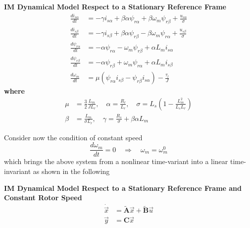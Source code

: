 \documentclass[11pt,a4paper]{scrartcl}
\numberwithin{equation}{section}
\theoremstyle{it}
\theoremstyle{definition}
\begin{document}
\begin{onehalfspace}
\begin{mybox}
	\textbf{IM Dynamical Model Respect to a Stationary Reference Frame}
	\begin{equation}\label{im_eq_33}
		\begin{aligned}
			\frac{di_{s\alpha}}{dt} &= -\gamma i_{s\alpha}  + 
			\beta\alpha\psi_{r\alpha}+\beta\omega_m\psi_{r\beta} + 
			\frac{u_{s\alpha}}{\sigma}\\[6pt]
			\frac{di_{s\beta}}{dt} &= -\gamma i_{s\beta}  + 
			\beta\alpha\psi_{r\beta}-\beta\omega_m\psi_{r\alpha} + 
			\frac{u_{s\beta}}{\sigma} \\[6pt]
			\frac{d\psi_{r\alpha}}{dt} &= -\alpha \psi_{r\alpha} 
			-\omega_m\psi_{r\beta}+\alpha L_m i_{s\alpha} \\[6pt]
			\frac{d\psi_{r\beta}}{dt} &= -\alpha \psi_{r\beta} 
			+\omega_m\psi_{r\alpha}+\alpha L_m i_{s\beta} \\[6pt]
			\frac{d\omega_m}{dt} &= \mu \left(\psi_{r\alpha}i_{s\beta} - 
			\psi_{r\beta}i_{s\alpha}\right)-\frac{\tau_l}{J}
		\end{aligned}
	\end{equation}
	\textbf{where}
	\begin{equation}\label{im_eq_34}
		\begin{aligned}
			\mu & = \frac{3}{2}\frac{L_m}{JL_r}, \quad
			\alpha = \frac{R_r}{L_r},  \quad
			\sigma = L_s \left(1-\frac{L_m^2}{L_sL_r}\right) \\[6pt]
			\beta & = \frac{L_m}{\sigma L_r},  \quad
			\gamma = \frac{R_s}{\sigma} + \beta \alpha L_m
		\end{aligned}
	\end{equation}
\end{mybox}
Consider now the condition of constant speed
\begin{equation}\label{im_eq_35}
	\frac{d\omega_m}{dt}=0 \quad\Rightarrow\quad\omega_m=\omega_m^0
\end{equation}
which brings the above system from a nonlinear time-variant into a linear 
time-invariant as shown in the following
\begin{mybox}
	\textbf{IM Dynamical Model Respect to a Stationary Reference Frame and 
		Constant Rotor Speed}
	\begin{equation}\label{im_eq_36}
		\begin{aligned}
			\dot{\vec{x}} &=\tilde{\mathbf{A}}\vec{x}+\tilde{\mathbf{B}}\vec{u} 
			\\[6pt]
			{\vec{y}} &={\mathbf{C}}\vec{x}
		\end{aligned}

\end{equation}
\end{mybox}
\end{onehalfspace}
\end{document}
